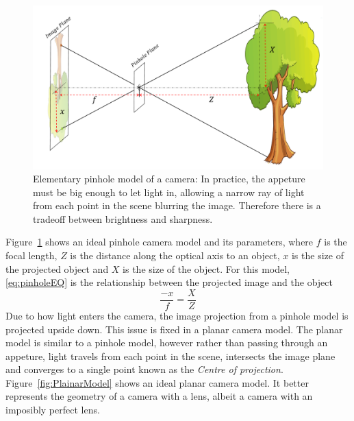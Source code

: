 \documentclass{UoNMCHA}
\numberwithin{equation}{section}
\begin{document}
\begin{figure}[ht]
    \begin{center}
        \includegraphics[width=.8\linewidth]{Figures/Pinhole_model}
        \caption{Elementary pinhole model of a camera: In practice, the appeture must be big enough to let light in, allowing a narrow ray of light from each point in the scene blurring the image. Therefore there is a tradeoff between brightness and sharpness.}
        \label{fig:PinholeModel}
    \end{center}
\end{figure}

Figure~\ref{fig:PinholeModel} shows an ideal pinhole camera model and its parameters, where $f$ is the focal length, $Z$ is the distance along the optical axis to an object, $x$ is the size of the projected object and $X$ is the size of the object. For this model, \eqref{eq:pinholeEQ} is the relationship between the projected image and the object
\begin{equation}\label{eq:pinholeEQ}
	\frac{-x}{f} = \frac{X}{Z}
\end{equation}
Due to how light enters the camera, the image projection from a pinhole model is projected upside down. This issue is fixed in a planar camera model. The planar model is similar to a pinhole model, however rather than passing through an appeture, light travels from each point in the scene, intersects the image plane and converges to a single point known as the \textit{Centre of projection}. Figure~\ref{fig:PlainarModel} shows an ideal planar camera model. It better represents the geometry of a camera with a lens, albeit a camera with an imposibly perfect lens.
\end{document}

